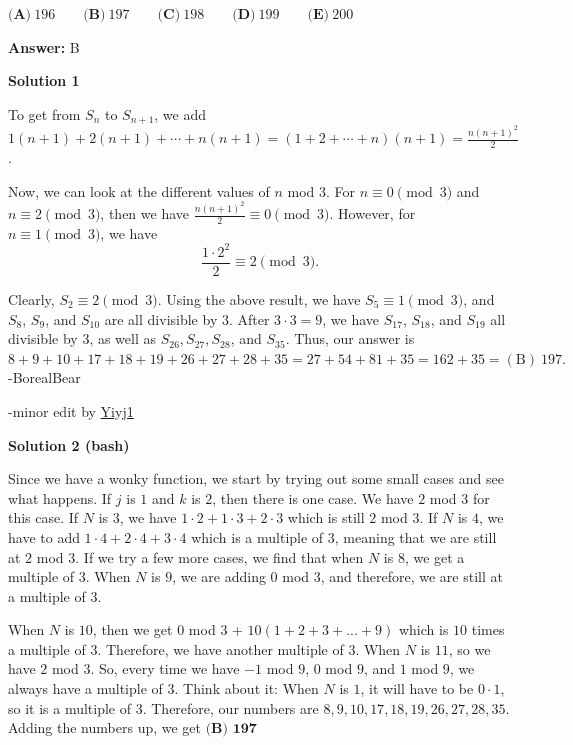 \begin{enumerate}
 $\textbf{(A)}\ 196 \qquad\textbf{(B)}\ 197 \qquad\textbf{(C)}\ 198 \qquad\textbf{(D)}\ 199 \qquad\textbf{(E)}\ 200$

 \textbf{Answer: }B



\textbf{Solution 1}

To get from $S_n$ to $S_{n+1}$, we add $1(n+1)+2(n+1)+\cdots +n(n+1)=(1+2+\cdots +n)(n+1)=\frac{n(n+1)^2}{2}$.

 Now, we can look at the different values of $n$ mod $3$. For $n\equiv 0\pmod{3}$ and $n\equiv 2\pmod{3}$, then we have $\frac{n(n+1)^2}{2}\equiv 0\pmod{3}$. However, for $n\equiv 1\pmod{3}$, we have
 \[\frac{1\cdot {2}^2}{2}\equiv 2\pmod{3}.\]

 Clearly, $S_2\equiv 2\pmod{3}.$ Using the above result, we have $S_5\equiv 1\pmod{3}$, and $S_8$, $S_9$, and $S_{10}$ are all divisible by $3$. After $3\cdot 3=9$, we have $S_{17}$, $S_{18}$, and $S_{19}$ all divisible by $3$, as well as $S_{26}, S_{27}, S_{28}$, and $S_{35}$. Thus, our answer is $8+9+10+17+18+19+26+27+28+35=27+54+81+35=162+35=\boxed{\mathrm{(B)}\ 197} .$ -BorealBear

 -minor edit by \href{https://artofproblemsolving.com/wiki/index.php?title=User:Yiyj1&action=edit&redlink=1}{Yiyj1}

 



\textbf{Solution 2 (bash)}

Since we have a wonky function, we start by trying out some small cases and see what happens. If $j$ is $1$ and $k$ is $2$, then there is one case. We have $2$ mod $3$ for this case. If $N$ is $3$, we have $1 \cdot 2 + 1 \cdot 3 + 2 \cdot 3$ which is still $2$ mod $3$. If $N$ is $4$, we have to add $1 \cdot 4 + 2 \cdot 4 + 3 \cdot 4$ which is a multiple of $3$, meaning that we are still at $2$ mod $3$. If we try a few more cases, we find that when $N$ is $8$, we get a multiple of $3$. When $N$ is $9$, we are adding $0$ mod $3$, and therefore, we are still at a multiple of $3$.

 When $N$ is $10$, then we get $0$ mod $3$ + $10(1+2+3+...+9)$ which is $10$ times a multiple of $3$. Therefore, we have another multiple of $3$. When $N$ is $11$, so we have $2$ mod $3$. So, every time we have $-1$ mod $9$, $0$ mod $9$, and $1$ mod $9$, we always have a multiple of $3$. Think about it: When $N$ is $1$, it will have to be $0 \cdot 1$, so it is a multiple of $3$. Therefore, our numbers are $8, 9, 10, 17, 18, 19, 26, 27, 28, 35$. Adding the numbers up, we get $\boxed{\textbf{(B) 197}}$





\end{enumerate}
